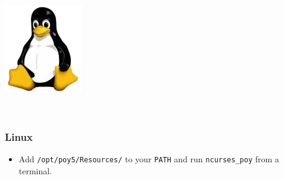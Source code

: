 {\begin{flushleft}
	\begin{minipage}[c]{0.074\textwidth}
   		\includegraphics[width=\textwidth]{doc/figures/figlogolinux.jpg}
	\end{minipage}
	\,
	\begin{minipage}[t]{0.88\textwidth}
	   	\subsubsection*{Linux}
	\end{minipage}
	\begin{itemize}
    		\item Add \texttt{/opt/poy5/Resources/} to your \texttt{PATH} and run
    \texttt{ncurses\_poy} from a terminal.
    	\end{itemize}
\end{flushleft}

}
